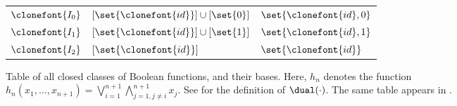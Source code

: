 \documentclass[11pt]{article}
\begin{document}
\begin{figure}[hbtp]
\begin{small}
\begin{longtable}[]{p{}p{}p{}}
            \begin{minipage}[t]{0.12\columnwidth}\raggedright
                \(\clonefont{I_0}\)\strut
            \end{minipage} & \begin{minipage}[t]{0.41\columnwidth}\raggedright
                \([\set{\clonefont{id}}] \cup [\set{0}]\)\strut
            \end{minipage} & \begin{minipage}[t]{0.38\columnwidth}\raggedright
                \(\set{\clonefont{id}, 0}\)\strut
            \end{minipage}\tabularnewline
            \begin{minipage}[t]{0.12\columnwidth}\raggedright
                \(\clonefont{I_1}\)\strut
            \end{minipage} & \begin{minipage}[t]{0.41\columnwidth}\raggedright
                \([\set{\clonefont{id}}] \cup [\set{1}]\)\strut
            \end{minipage} & \begin{minipage}[t]{0.38\columnwidth}\raggedright
                \(\set{\clonefont{id}, 1}\)\strut
            \end{minipage}\tabularnewline
            \begin{minipage}[t]{0.12\columnwidth}\raggedright
                \(\clonefont{I_2}\)\strut
            \end{minipage} & \begin{minipage}[t]{0.41\columnwidth}\raggedright
                \([\set{\clonefont{id}}]\)\strut
            \end{minipage} & \begin{minipage}[t]{0.38\columnwidth}\raggedright
                \(\set{\clonefont{id}}\)\strut
            \end{minipage}\tabularnewline
            \bottomrule
        \end{longtable}
    \end{small}
    \caption{
        Table of all closed classes of Boolean functions, and their bases.
        Here, $h_n$ denotes the function
        $h_n(x_1,\dots,x_{n+1}) = \bigvee_{i=1}^{n+1} \bigwedge_{j = 1,
        j \neq i}^{n+1} x_j$.
        See  for the definition of $\dual(\cdot)$.
        The same
        table appears in
    \cite[Table 1]{DBLP:journals/jcss/AllenderBISV09}.}
    \label{fig:clone_table}
\end{figure}
\end{document}
